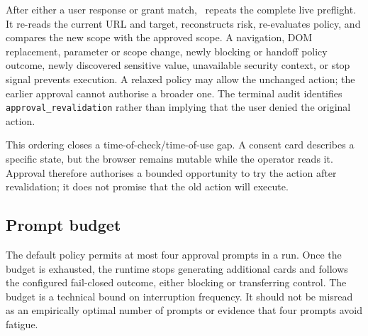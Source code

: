 After either a user response or grant match, \systemname\ repeats the complete
live preflight. It re-reads the current URL and target, reconstructs risk,
re-evaluates policy, and compares the new scope with the approved scope. A
navigation, DOM replacement, parameter or scope change, newly blocking or
handoff policy outcome, newly discovered sensitive value, unavailable security
context, or stop signal prevents execution. A relaxed policy may allow the
unchanged action; the earlier approval cannot authorise a broader one. The
terminal audit identifies
\texttt{approval\_revalidation} rather than implying that the user denied the
original action.

This ordering closes a time-of-check/time-of-use gap. A consent card describes
a specific state, but the browser remains mutable while the operator reads it.
Approval therefore authorises a bounded opportunity to try the action after
revalidation; it does not promise that the old action will execute.

\subsection{Prompt budget}

The default policy permits at most four approval prompts in a run. Once the
budget is exhausted, the runtime stops generating additional cards and follows
the configured fail-closed outcome, either blocking or transferring control.
The budget is a technical bound on interruption frequency. It should not be
misread as an empirically optimal number of prompts or evidence that four
prompts avoid fatigue.

